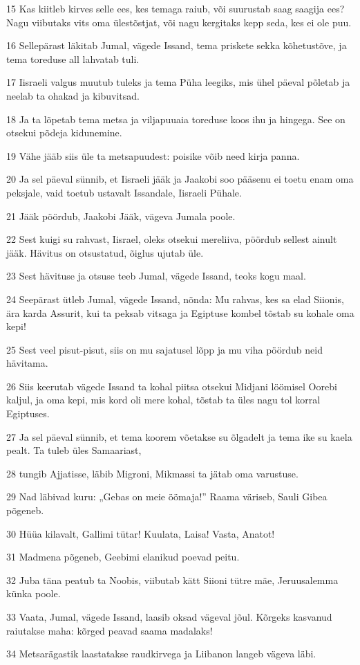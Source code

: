 \par 15 Kas kiitleb kirves selle ees, kes temaga raiub, või suurustab saag saagija ees? Nagu viibutaks vits oma ülestõstjat, või nagu kergitaks kepp seda, kes ei ole puu.
\par 16 Sellepärast läkitab Jumal, vägede Issand, tema priskete sekka kõhetustõve, ja tema toreduse all lahvatab tuli.
\par 17 Iisraeli valgus muutub tuleks ja tema Püha leegiks, mis ühel päeval põletab ja neelab ta ohakad ja kibuvitsad.
\par 18 Ja ta lõpetab tema metsa ja viljapuuaia toreduse koos ihu ja hingega. See on otsekui põdeja kidunemine.
\par 19 Vähe jääb siis üle ta metsapuudest: poisike võib need kirja panna.
\par 20 Ja sel päeval sünnib, et Iisraeli jääk ja Jaakobi soo pääsenu ei toetu enam oma peksjale, vaid toetub ustavalt Issandale, Iisraeli Pühale.
\par 21 Jääk pöördub, Jaakobi Jääk, vägeva Jumala poole.
\par 22 Sest kuigi su rahvast, Iisrael, oleks otsekui mereliiva, pöördub sellest ainult jääk. Hävitus on otsustatud, õiglus ujutab üle.
\par 23 Sest hävituse ja otsuse teeb Jumal, vägede Issand, teoks kogu maal.
\par 24 Seepärast ütleb Jumal, vägede Issand, nõnda: Mu rahvas, kes sa elad Siionis, ära karda Assurit, kui ta peksab vitsaga ja Egiptuse kombel tõstab su kohale oma kepi!
\par 25 Sest veel pisut-pisut, siis on mu sajatusel lõpp ja mu viha pöördub neid hävitama.
\par 26 Siis keerutab vägede Issand ta kohal piitsa otsekui Midjani löömisel Oorebi kaljul, ja oma kepi, mis kord oli mere kohal, tõstab ta üles nagu tol korral Egiptuses.
\par 27 Ja sel päeval sünnib, et tema koorem võetakse su õlgadelt ja tema ike su kaela pealt. Ta tuleb üles Samaariast,
\par 28 tungib Ajjatisse, läbib Migroni, Mikmassi ta jätab oma varustuse.
\par 29 Nad läbivad kuru: „Gebas on meie öömaja!” Raama väriseb, Sauli Gibea põgeneb.
\par 30 Hüüa kilavalt, Gallimi tütar! Kuulata, Laisa! Vasta, Anatot!
\par 31 Madmena põgeneb, Geebimi elanikud poevad peitu.
\par 32 Juba täna peatub ta Noobis, viibutab kätt Siioni tütre mäe, Jeruusalemma künka poole.
\par 33 Vaata, Jumal, vägede Issand, laasib oksad vägeval jõul. Kõrgeks kasvanud raiutakse maha: kõrged peavad saama madalaks!
\par 34 Metsarägastik laastatakse raudkirvega ja Liibanon langeb vägeva läbi.

